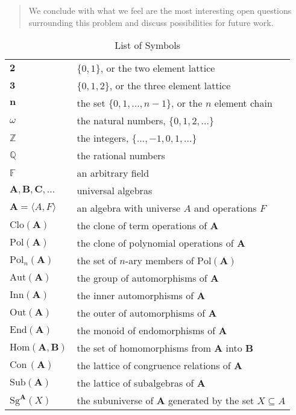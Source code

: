 \documentclass[cm,dissertation,actual,final]{uhthesis}
\theoremstyle{plain}
\theoremstyle{definition}
\theoremstyle{remark}
\numberwithin{theorem}{section}
\numberwithin{claim}{chapter}
\numberwithin{equation}{section}
\numberwithin{conjecture}{chapter}
\newcommand{\<}{\ensuremath{\langle}}
\renewcommand{\>}{\ensuremath{\rangle}}
\newcommand{\F}{\ensuremath{\mathbb{F}}}   %
\newcommand{\Z}{\ensuremath{\mathbb{Z}}}   %
\newcommand{\Q}{\ensuremath{\mathbb{Q}}}   %
\newcommand{\Hom}{\ensuremath{\mathrm{Hom}}}
\newcommand{\End}{\ensuremath{\mathrm{End}}}
\newcommand{\Aut}{\ensuremath{\mathrm{Aut}}}
\newcommand{\Sg}{\ensuremath{\mathrm{Sg}}}
\newcommand{\Con}{\ensuremath{\mathrm{Con\,}}}
\newcommand{\Sub}{\ensuremath{\mathrm{Sub}}}
\newcommand{\Pol}{\ensuremath{\mathrm{Pol}}}
\newcommand{\Clo}{\ensuremath{\mathrm{Clo}}}
\newcommand{\0}{\ensuremath{\mathbf{0}}}
\newcommand{\1}{\ensuremath{\mathbf{1}}}
\newcommand{\2}{\ensuremath{\mathbf{2}}}
\newcommand{\3}{\ensuremath{\mathbf{3}}}
\newcommand{\4}{\ensuremath{\mathbf{4}}}
\newcommand{\5}{\ensuremath{\mathbf{5}}}
\newcommand{\bA}{\ensuremath{\mathbf{A}}}
\newcommand{\bB}{\ensuremath{\mathbf{B}}}
\newcommand{\bC}{\ensuremath{\mathbf{C}}}
\newcommand{\bn}{\ensuremath{\mathbf{n}}}
\newcommand{\Out}{\ensuremath{\mathrm{Out}}}
\newcommand{\Inn}{\ensuremath{\mathrm{Inn}}}
\begin{document}
\begin{frontmatter}
\begin{abstract}
We conclude with what we feel are the most interesting open questions
surrounding this problem and discuss possibilities for future work. 

\end{abstract}

\tableofcontents

\listoffigures


\newpage 

\begin{table}
  \caption{List of Symbols}
  \label{tab:notation}
    \begin{tabular}{ll}
      $\2$ & $\{0, 1\}$, or the two element lattice \\
      $\3$ & $\{0, 1, 2\}$, or the three element lattice \\
      $\bn$ & the set $\{0, 1, \dots, n-1\}$, or the $n$ element chain\\
      $\omega$ & the natural numbers, $\{0, 1, 2, \dots \}$\\
      \Z & the integers, $\{\dots, -1, 0, 1, \dots\}$\\
      \Q & the rational numbers\\
      \F & an arbitrary field \\
      $\bA, \bB, \bC, \dots$ & universal algebras\\
      $\bA = \<A, F\>$ & an algebra with universe $A$ and operations $F$\\
      $\Clo (\bA)$ & the clone of term operations of $\bA$\\
      $\Pol(\bA)$ & the clone of polynomial operations of $\bA$\\
      $\Pol_n(\bA)$ & the set of $n$-ary members of $\Pol(\bA)$\\
      $\Aut(\bA)$ & the group of automorphisms of $\bA$\\
      $\Inn(\bA)$ & the inner automorphisms of $\bA$\\
      $\Out(\bA)$ & the outer of automorphisms of $\bA$\\
      $\End(\bA)$ & the monoid of endomorphisms of $\bA$\\
      $\Hom(\bA, \bB)$& the set of homomorphisms from $\bA$ into $\bB$\\
      $\Con(\bA)$& the lattice of congruence relations of $\bA$\\
      $\Sub(\bA)$& the lattice of subalgebras of $\bA$\\
      $\Sg^{\bA}(X)$& the subuniverse of $\bA$ generated by the set $X\subseteq A$\\

\end{tabular}
\end{table}
\end{frontmatter}
\end{document}
